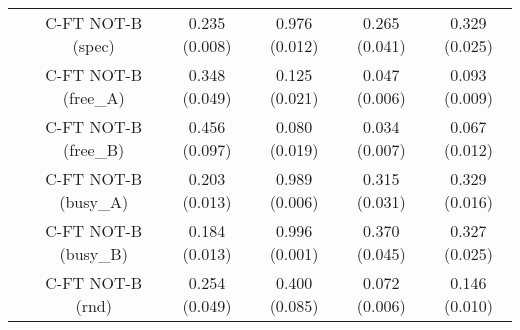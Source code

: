 \begin{table}[h]
{\begin{tabular}{cccccc}
 & C-FT NOT-B (spec)         & 0.235 (0.008) & 0.976 (0.012) & 0.265 (0.041) & 0.329 (0.025) \\ 
 & C-FT NOT-B (free_A)       & 0.348 (0.049) & 0.125 (0.021) & 0.047 (0.006) & 0.093 (0.009) \\ 
 & C-FT NOT-B (free_B)       & 0.456 (0.097) & 0.080 (0.019) & 0.034 (0.007) & 0.067 (0.012) \\ 
 & C-FT NOT-B (busy_A)       & 0.203 (0.013) & 0.989 (0.006) & 0.315 (0.031) & 0.329 (0.016) \\ 
 & C-FT NOT-B (busy_B)       & 0.184 (0.013) & 0.996 (0.001) & 0.370 (0.045) & 0.327 (0.025) \\ 
 & C-FT NOT-B (rnd)          & 0.254 (0.049) & 0.400 (0.085) & 0.072 (0.006) & 0.146 (0.010) \\ \bottomrule
\end{tabular}
}
\end{table}
